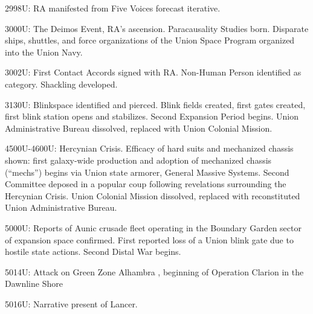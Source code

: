 2998U: RA manifested from Five Voices forecast iterative.     
 

3000U: The Deimos Event, RA’s ascension. Paracausality Studies born. Disparate ships, shuttles,  
and force organizations of the Union Space Program organized into the Union Navy.  
 

                                                                                                                  


3002U: First Contact Accords signed with RA. Non-Human Person identified as category.  
Shackling developed. 
 

3130U: Blinkspace identified and pierced. Blink fields created, first gates created, first blink  
station opens and stabilizes. Second Expansion Period begins. Union Administrative Bureau  
dissolved, replaced with Union Colonial Mission.  
 

4500U-4600U: Hercynian Crisis. Efficacy of hard suits and mechanized chassis shown: first  
galaxy-wide production and adoption of mechanized chassis (“mechs”) begins via Union state  
armorer, General Massive Systems. Second Committee deposed in a popular coup following  
revelations surrounding the Hercynian Crisis. Union Colonial Mission dissolved, replaced with  
reconstituted Union Administrative Bureau.  
 

5000U: Reports of Aunic crusade fleet operating in the Boundary Garden sector of expansion  
space confirmed. First reported loss of a Union blink gate due to hostile state actions. Second  
Distal War begins. 
 

5014U: Attack on Green Zone Alhambra , beginning of Operation Clarion in the Dawnline Shore
 

5016U: Narrative present of Lancer. 
 

                                          